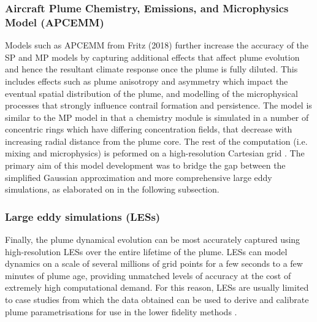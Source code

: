 \subsubsection{Aircraft Plume Chemistry, Emissions, and Microphysics Model (APCEMM)}
Models such as APCEMM from Fritz (2018) \cite{Fritz2018} further increase the accuracy of the SP and MP models by capturing additional effects that affect plume evolution and hence the resultant climate response once the plume is fully diluted. This includes effects such as plume anisotropy and asymmetry which impact the eventual spatial distribution of the plume, and modelling of the microphysical processes that strongly influence contrail formation and persistence. The model is similar to the MP model in that a chemistry module is simulated in a number of concentric rings which have differing concentration fields, that decrease with increasing radial distance from the plume core. The rest of the computation (i.e. mixing and microphysics) is peformed on a high-resolution Cartesian grid \cite{FritzConvo}. The primary aim of this model development was to bridge the gap between the simplified Gaussian approximation and more comprehensive large eddy simulations, as elaborated on in the following subsection.


\subsubsection{Large eddy simulations (LESs)}
Finally, the plume dynamical evolution can be most accurately captured using high-resolution LESs over the entire lifetime of the plume. LESs can model dynamics on a scale of several millions of grid points for a few seconds to a few minutes of plume age, providing unmatched levels of accuracy at the cost of extremely high computational demand. For this reason, LESs are usually limited to case studies from which the data obtained can be used to derive and calibrate plume parametrisations for use in the lower fidelity methods \cite{Lewellen1998}. 

